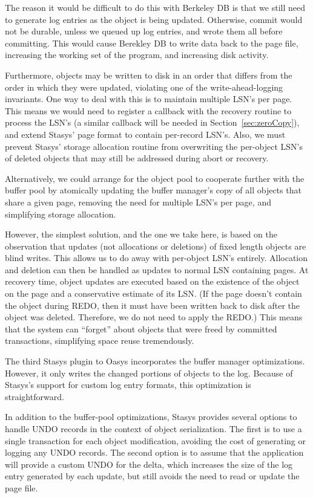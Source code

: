 \documentclass[letterpaper,twocolumn,10pt]{article}
\newcommand{\yad}{Stasys\xspace}
\newcommand{\yads}{Stasys'\xspace}
\newcommand{\oasys}{Oasys\xspace}
\begin{document}
The reason it would be difficult to do this with Berkeley DB is that
we still need to generate log entries as the object is being updated.
Otherwise, commit would not be durable, unless we queued up log 
entries, and wrote them all before committing.  
  This would cause Berekley DB to write data back to the
page file, increasing the working set of the program, and increasing
disk activity.

Furthermore, objects may be written to disk in an
order that differs from the order in which they were updated, 
violating one of the write-ahead-logging invariants.  One way to 
deal with this is to maintain multiple LSN's per page.  This means we would need to register a
callback with the recovery routine to process the LSN's (a similar
callback will be needed in Section~\ref{sec:zeroCopy}), and 
extend \yads page format to contain per-record LSN's.  
Also, we must prevent \yads storage allocation routine from overwriting the per-object 
LSN's of deleted objects that may still be addressed during abort or recovery.  

Alternatively, we could arrange for the object pool to cooperate 
further with the buffer pool by atomically updating the buffer 
manager's copy of all objects that share a given page, removing the 
need for multiple LSN's per page, and simplifying storage allocation.

However, the simplest solution, and the one we take here, is based on the observation that
updates (not allocations or deletions) of fixed length objects are blind writes.
This allows us to do away with per-object LSN's entirely.  Allocation and deletion can then be handled
as updates to normal LSN containing pages.  At recovery time, object
updates are executed based on the existence of the object on the page
and a conservative estimate of its LSN.  (If the page doesn't contain
the object during REDO, then it must have been written back to disk
after the object was deleted.  Therefore, we do not need to apply the
REDO.)  This means that the system can ``forget'' about objects that 
were freed by committed transactions, simplifying space reuse 
tremendously.

The third \yad plugin to \oasys incorporates the buffer
manager optimizations.  However, it only writes the changed portions of
objects to the log.  Because of \yad's support for custom log entry
formats, this optimization is straightforward.

In addition to the buffer-pool optimizations, \yad provides several 
options to handle UNDO records in the context
of object serialization. The first is to use a single transaction for
each object modification, avoiding the cost of generating or logging
any UNDO records. The second option is to assume that the
application will provide a custom UNDO for the delta, 
which increases the size of the log entry generated by each update, 
but still avoids the need to read or update the page
file.
\end{document}
